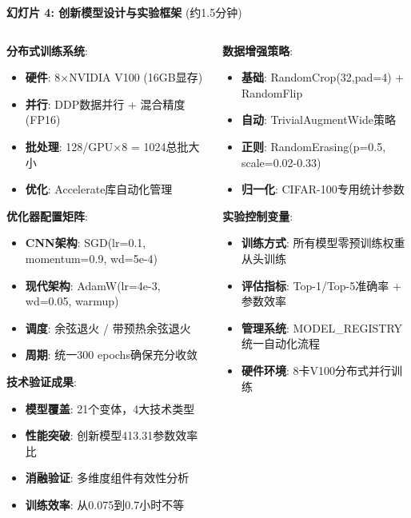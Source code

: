 \documentclass[10pt]{beamer}
\begin{document}
\begin{frame}{\textbf{幻灯片 4: 创新模型设计与实验框架} (约1.5分钟)}
{\begin{columns}[T]
\begin{column}{0.48\textwidth}
        \textbf{分布式训练系统}:
        \begin{itemize}
            \item \textbf{硬件}: 8×NVIDIA V100 (16GB显存)
            \item \textbf{并行}: DDP数据并行 + 混合精度(FP16)
            \item \textbf{批处理}: 128/GPU×8 = 1024总批大小
            \item \textbf{优化}: Accelerate库自动化管理
        \end{itemize}
        
        \textbf{优化器配置矩阵}:
        \begin{itemize}
            \item \textbf{CNN架构}: SGD(lr=0.1, momentum=0.9, wd=5e-4)
            \item \textbf{现代架构}: AdamW(lr=4e-3, wd=0.05, warmup)
            \item \textbf{调度}: 余弦退火 / 带预热余弦退火
            \item \textbf{周期}: 统一300 epochs确保充分收敛
        \end{itemize}
        
        \textbf{技术验证成果}:
        \begin{itemize}
            \item \textbf{模型覆盖}: 21个变体，4大技术类型
            \item \textbf{性能突破}: 创新模型413.31参数效率比
            \item \textbf{消融验证}: 多维度组件有效性分析
            \item \textbf{训练效率}: 从0.075到0.7小时不等
        \end{itemize}
    \end{column}
    \begin{column}{0.48\textwidth}
        \textbf{数据增强策略}:
        \begin{itemize}
            \item \textbf{基础}: RandomCrop(32,pad=4) + RandomFlip
            \item \textbf{自动}: TrivialAugmentWide策略
            \item \textbf{正则}: RandomErasing(p=0.5, scale=0.02-0.33)
            \item \textbf{归一化}: CIFAR-100专用统计参数
        \end{itemize}
        
        \textbf{实验控制变量}:
        \begin{itemize}
            \item \textbf{训练方式}: 所有模型零预训练权重从头训练
            \item \textbf{评估指标}: Top-1/Top-5准确率 + 参数效率
            \item \textbf{管理系统}: MODEL\_REGISTRY统一自动化流程
            \item \textbf{硬件环境}: 8卡V100分布式并行训练
        \end{itemize}
        

\end{column}
\end{columns}}
\end{frame}
\end{document}
